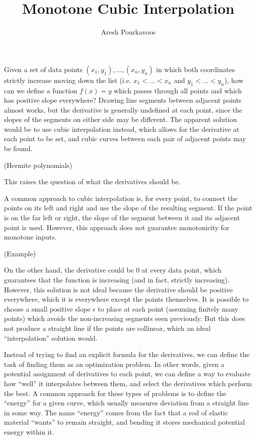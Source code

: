 \documentclass{article}
\begin{document}
\title{Monotone Cubic Interpolation}
\author{Aresh Pourkavoos}
\maketitle

Given a set of data points $(x_1, y_1), \ldots, (x_n, y_n)$
in which both coordinates strictly increase moving down the list
(i.e. $x_1 < \ldots < x_n$ and $y_1 < \ldots < y_n$),
how can we define a function $f(x) = y$ which passes through all points
and which has positive slope everywhere?
Drawing line segments between adjacent points almost works,
but the derivative is generally undefined at each point,
since the slopes of the segments on either side may be different.
The apparent solution would be to use cubic interpolation instead,
which allows for the derivative at each point to be set,
and cubic curves between each pair of adjacent points may be found.

(Hermite polynomials)

This raises the question of what the derivatives should be.

A common approach to cubic interpolation
is, for every point,
to connect the points on its left and right
and use the slope of the resulting segment.
If the point is on the far left or right,
the slope of the segment between it and its adjacent point is used.
However, this approach does not guarantee monotonicity for monotone inputs.

(Example)

On the other hand, the derivative could be 0 at every data point,
which guarantees that the function is increasing (and in fact, strictly increasing).
However, this solution is not ideal because
the derivative should be positive everywhere,
which it is everywhere except the points themselves.
It is possible to choose a small positive slope $\epsilon$ to place at each point
(assuming finitely many points)
which avoids the non-increasing segments seen previously.
But this does not produce a straight line if the points are collinear,
which an ideal ``interpolation'' solution would.

Instead of trying to find an explicit formula for the derivatives,
we can define the task of finding them as an optimization problem.
In other words, given a potential assignment of derivatives to each point,
we can define a way to evaluate how ``well'' it interpolates between them,
and select the derivatives which perform the best.
A common approach for these types of problems is to define the ``energy'' for a given curve,
which usually measures deviation from a straight line in some way.
The name ``energy'' comes from the fact that a rod of elastic material ``wants'' to remain straight,
and bending it stores mechanical potential energy within it.
\end{document}
